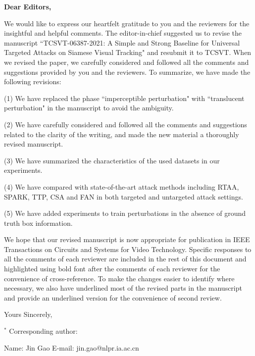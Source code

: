 \addtolength{\voffset}{-0.5in}
\addtolength{\hoffset}{-0.3in}
\addtolength{\textheight}{2cm}

\signature{Zhenbang Li, Yaya Shi, Jin Gao$^*$, Shaoru Wang, Bing Li, Pengpeng Liang, Weiming Hu}
            
\begin{letter}{}
\opening{\textbf{Dear Editors,}}

We would like to express our heartfelt gratitude to you and the reviewers for the insightful and helpful comments.
The editor-in-chief suggested us to revise the manuscript ``TCSVT-06387-2021: A Simple and Strong Baseline for Universal Targeted Attacks on Siamese Visual Tracking" and resubmit it to TCSVT.
When we revised the paper, we carefully considered and followed all the comments and suggestions provided by you and the reviewers. To summarize, we have made the following revisions:

(1) We have replaced the phase ``imperceptible perturbation" with ``translucent perturbation" in the manuscript to avoid the ambiguity.

(2) We have carefully considered and followed all the comments and suggestions related to the clarity of the writing, and made the new material a thoroughly revised manuscript.

(3) We have summarized the characteristics of the used datasets in our experiments.

(4) We have compared with state-of-the-art attack methods including RTAA, SPARK, TTP, CSA and FAN in both targeted and untargeted attack settings.

(5) We have added experiments to train perturbations in the absence of ground truth box information.

We hope that our revised manuscript is now appropriate for publication in IEEE Transactions on Circuits and Systems for Video Technology. Specific responses to all the comments of each reviewer are included in the rest of this document and highlighted using bold font after the comments of each reviewer for the convenience of cross-reference. To make the changes easier to identify where necessary, we also have underlined most of the revised parts in the manuscript and provide an underlined version for the convenience of second review.

\vspace{2\parskip}
\closing{Yours Sincerely,}
\vspace{5mm}
$^*$ Corresponding author:
\vspace{-2mm}

Name: Jin Gao   \quad\quad  E-mail: jin.gao@nlpr.ia.ac.cn
\end{letter}



